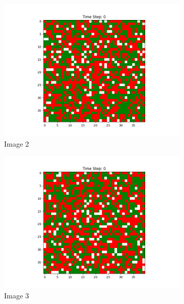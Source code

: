 \documentclass[12pt]{article}
\begin{document}
\begin{figure}[h]
		\begin{subfigure}{0.2\textwidth}
			\includegraphics[width=\linewidth]{initial_social_n5p3.png}
			\caption{Image 2}
		\end{subfigure}\hspace{0.02\textwidth}
		\begin{subfigure}{0.2\textwidth}
			\includegraphics[width=\linewidth]{initial_social_n5p5.png}				
			\caption{Image 3}
		\end{subfigure}\hspace{0.02\textwidth}
		\begin{subfigure}{0.2\textwidth}

\end{subfigure}
\end{figure}
\end{document}
